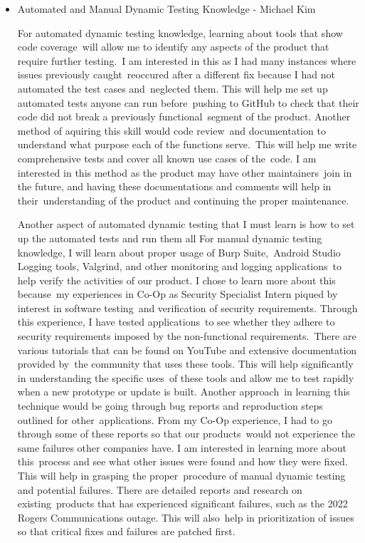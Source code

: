 \documentclass[12pt, titlepage]{article}
\begin{document}
\begin{itemize}
  \item Automated and Manual Dynamic Testing Knowledge - Michael Kim
  
  For automated dynamic testing knowledge, learning about tools that show code coverage\
  will allow me to identify any aspects of the product that require further testing.\
  I am interested in this as I had many instances where issues previously caught\
  reoccured after a different fix because I had not automated the test cases and\
  neglected them. This will help me set up automated tests anyone can run before\
  pushing to GitHub to check that their code did not break a previously functional\
  segment of the product. Another method of aquiring this skill would code review\
  and documentation to understand what purpose each of the functions serve.\
  This will help me write comprehensive tests and cover all known use cases of the\
  code. I am interested in this method as the product may have other maintainers\
  join in the future, and having these documentations and comments will help in their\
  understanding of the product and continuing the proper maintenance.

  Another aspect of automated dynamic testing that I must learn is how to set up the automated tests and run them all
  For manual dynamic testing knowledge, I will learn about proper usage of Burp Suite,\
  Android Studio Logging tools, Valgrind, and other monitoring and logging applications\
  to help verify the activities of our product. I chose to learn more about this because\
  my experiences in Co-Op as Security Specialist Intern piqued by interest in software testing\
  and verification of security requirements. Through this experience, I have tested applications\
  to see whether they adhere to security requirements imposed by the non-functional requirements.\
  There are various tutorials that can be found on YouTube and extensive documentation provided by\
  the community that uses these tools. This will help significantly in understanding the specific uses\
  of these tools and allow me to test rapidly when a new prototype or update is built. Another approach\
  in learning this technique would be going through bug reports and reproduction steps outlined for other\
  applications. From my Co-Op experience, I had to go through some of these reports so that our products\
  would not experience the same failures other companies have. I am interested in learning more about this\
  process and see what other issues were found and how they were fixed. This will help in grasping the proper\
  procedure of manual dynamic testing and potential failures. There are detailed reports and research on existing\
  products that has experienced significant failures, such as the 2022 Rogers Communications outage. This will also\
  help in prioritization of issues so that critical fixes and failures are patched first.
\end{itemize}
\end{document}
